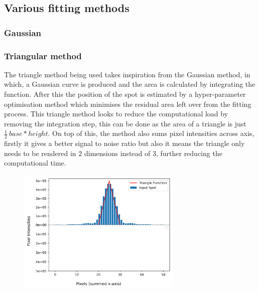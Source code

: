 \documentclass[aps,pra,a4paper,nofootinbib,onecolumn,tightenlines,longbibliography,12pt,amsfonts,amssymb,amsmath,floatfix]{revtex4-2} %
\begin{document}
  \subsection{Various fitting methods} %
  \label{sub:Various fitting methods}
  
    \subsubsection{Gaussian} %
    \label{ssub:Gaussian}



    
    \subsubsection{Triangular method} %
    \label{ssub:Triangular method}
    
    The triangle method being used takes inspiration from the Gaussian method, in which,
    a Gaussian curve is produced and the area is calculated by integrating the function. 
    After this the position of the spot is estimated by a hyper-parameter optimisation method 
    which minimises the residual area left over from the fitting process.
    This triangle method looks to reduce the computational load by removing the integration step, 
    this can be done as the area of a triangle is just $\frac{1}{2}\ base*height$. 
    On top of this, the method also sums pixel intensities across axis, firstly it gives a 
    better signal to noise ratio but also it means the triangle only needs to be rendered in 2 dimensions 
    instead of 3, further reducing the computational time. 

    \begin{figure}[h]
      \begin{center}
        \includegraphics[width=0.7\textwidth]{project_pics/visual_test_2.png}
      \end{center}
      \caption{}
      \label{fig:visual_test_2}
    \end{figure}
\end{document}
